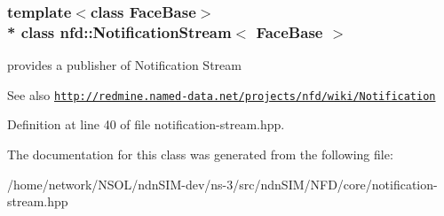 \subsubsection*{template$<$class Face\+Base$>$\\*
class nfd\+::\+Notification\+Stream$<$ Face\+Base $>$}

provides a publisher of Notification Stream 

\begin{DoxySeeAlso}{See also}
\href{http://redmine.named-data.net/projects/nfd/wiki/Notification}{\tt http\+://redmine.\+named-\/data.\+net/projects/nfd/wiki/\+Notification} 
\end{DoxySeeAlso}


Definition at line 40 of file notification-\/stream.\+hpp.



The documentation for this class was generated from the following file\+:\begin{DoxyCompactItemize}
\item 
/home/network/\+N\+S\+O\+L/ndn\+S\+I\+M-\/dev/ns-\/3/src/ndn\+S\+I\+M/\+N\+F\+D/core/notification-\/stream.\+hpp\end{DoxyCompactItemize}
